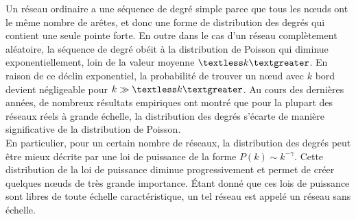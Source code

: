 Un réseau ordinaire a une séquence de degré simple parce que tous les nœuds ont le même nombre de arêtes, et donc une forme de distribution des degrés qui contient une seule pointe forte. En outre dans le cas d'un réseau complètement aléatoire, 
la séquence de degré obéit à la distribution de Poisson qui diminue exponentiellement, loin de la valeur moyenne $\textless k\textgreater$. En raison de ce déclin exponentiel, la probabilité de trouver un nœud avec $k$ bord devient négligeable pour  $k\gg \textless k\textgreater$.
Au cours des dernières années, de nombreux résultats empiriques ont montré que pour la plupart des réseaux réels à grande échelle, la distribution des degrés s'écarte de manière significative de la distribution de Poisson.\\
En particulier, pour un certain nombre de réseaux, la distribution des degrés peut être mieux décrite par une loi de puissance de la forme $P(k)\sim k^{-\gamma}$. Cette distribution de la loi de puissance diminue progressivement et permet de créer quelques nœuds de très grande importance. Étant donné que ces lois de puissance sont libres de toute échelle caractéristique, un tel réseau est appelé un réseau sans échelle.

